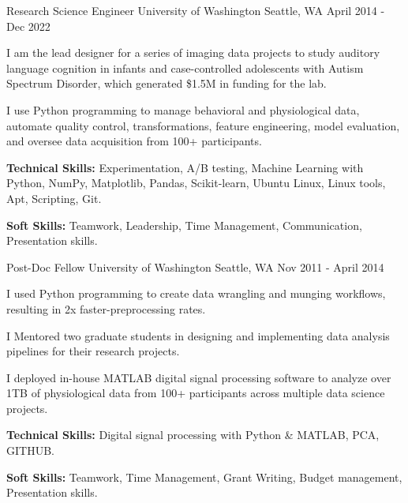 

\begin{cventries}

  \cventry
  {Research Science Engineer} %
  {University of Washington} %
  {Seattle, WA} %
  {April 2014 - Dec 2022} %
  {
    \begin{cvitems} %
      \item {I am the lead designer for a series of imaging data projects to study auditory language cognition in infants and case-controlled adolescents with Autism Spectrum Disorder, which generated \$1.5M in funding for the lab.}
      \item {I use Python programming to manage behavioral and physiological data, automate quality control, transformations, feature engineering, model evaluation, and oversee data acquisition from 100+ participants.}
      \item {\textbf{Technical Skills:} Experimentation, A/B testing, Machine Learning with Python, NumPy, Matplotlib, Pandas, Scikit-learn, Ubuntu Linux, Linux tools, Apt, Scripting, Git.}
      \item {\textbf{Soft Skills:} Teamwork, Leadership, Time Management, Communication, Presentation skills.}
    \end{cvitems}
  }

  \cventry
  {Post-Doc Fellow} %
  {University of Washington} %
  {Seattle, WA} %
  {Nov 2011 - April 2014} %
  {
    \begin{cvitems} %
      \item {I used Python programming to create data wrangling and munging workflows, resulting in 2x faster-preprocessing rates.}
      \item {I Mentored two graduate students in designing and implementing data analysis pipelines for their research projects.}
      \item {I deployed in-house MATLAB digital signal processing software to analyze over 1TB of physiological data from 100+ participants across multiple data science projects.}
      \item {\textbf{Technical Skills:} Digital signal processing with Python \& MATLAB, PCA, GITHUB.}
      \item {\textbf{Soft Skills:} Teamwork, Time Management, Grant Writing, Budget management, Presentation skills.}
    \end{cvitems}
  }


\end{cventries}
